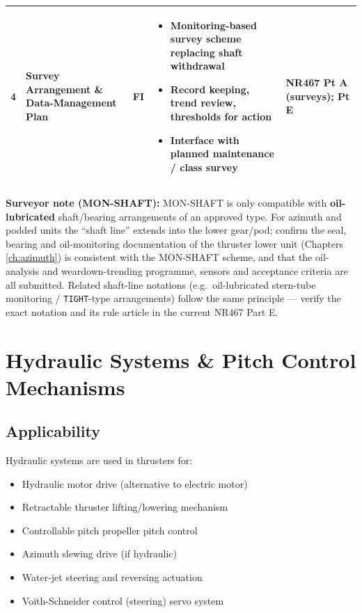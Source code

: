 \documentclass[11pt,a4paper]{report}
\newcommand{\fic}{\textbf{\textcolor{bvgray}{FI}}}
\begin{document}
\begin{longtable}{|p{0.5cm}|p{5cm}|p{1.5cm}|p{5.5cm}|p{2cm}|}
4 & Survey Arrangement \& Data-Management Plan & \fic{} &
\begin{itemize}[leftmargin=*,nosep]
\item Monitoring-based survey scheme replacing shaft withdrawal
\item Record keeping, trend review, thresholds for action
\item Interface with planned maintenance / class survey
\end{itemize} & NR467 Pt A (surveys); Pt E \\
\hline

\end{longtable}

\noindent\textbf{Surveyor note (MON-SHAFT):} MON-SHAFT is only compatible with
\textbf{oil-lubricated} shaft/bearing arrangements of an approved type. For
azimuth and podded units the ``shaft line'' extends into the lower gear/pod;
confirm the seal, bearing and oil-monitoring documentation of the thruster
lower unit (Chapters \ref{ch:azimuth}) is consistent with the MON-SHAFT scheme,
and that the oil-analysis and weardown-trending programme, sensors and
acceptance criteria are all submitted. Related shaft-line notations (e.g.\
oil-lubricated stern-tube monitoring / \texttt{TIGHT}-type arrangements) follow
the same principle --- verify the exact notation and its rule article in the
current NR467 Part E.

\newpage

\chapter{Hydraulic Systems \& Pitch Control Mechanisms}
\label{ch:hydraulics}

\section{Applicability}

Hydraulic systems are used in thrusters for:
\begin{itemize}[leftmargin=*]
\item Hydraulic motor drive (alternative to electric motor)
\item Retractable thruster lifting/lowering mechanism
\item Controllable pitch propeller pitch control
\item Azimuth slewing drive (if hydraulic)
\item Water-jet steering and reversing actuation
\item Voith-Schneider control (steering) servo system
\end{itemize}
\end{document}
